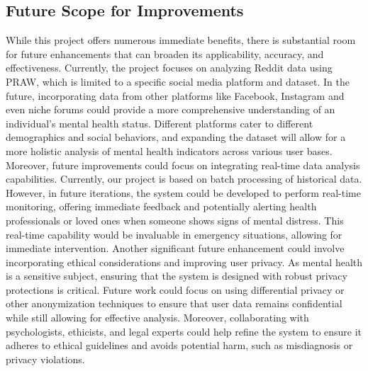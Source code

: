 \subsection{Future Scope for Improvements}
\noindent
While this project offers numerous immediate benefits, there is substantial room for future enhancements that can broaden its applicability, accuracy, and effectiveness. Currently, the project focuses on analyzing Reddit data using PRAW, which is limited to a specific social media platform and dataset. In the future, incorporating data from other platforms like Facebook, Instagram and even niche forums could provide a more comprehensive understanding of an individual’s mental health status. Different platforms cater to different demographics and social behaviors, and expanding the dataset will allow for a more holistic analysis of mental health indicators across various user bases. Moreover, future improvements could focus on integrating real-time data analysis capabilities. Currently, our project is based on batch processing of historical data. However, in future iterations, the system could be developed to perform real-time monitoring, offering immediate feedback and potentially alerting health professionals or loved ones when someone shows signs of mental distress. This real-time capability would be invaluable in emergency situations, allowing for immediate intervention. Another significant future enhancement could involve incorporating ethical considerations and improving user privacy. As mental health is a sensitive subject, ensuring that the system is designed with robust privacy protections is critical. Future work could focus on using differential privacy or other anonymization techniques to ensure that user data remains confidential while still allowing for effective analysis. Moreover, collaborating with psychologists, ethicists, and legal experts could help refine the system to ensure it adheres to ethical guidelines and avoids potential harm, such as misdiagnosis or privacy violations.

\vspace{1em}

